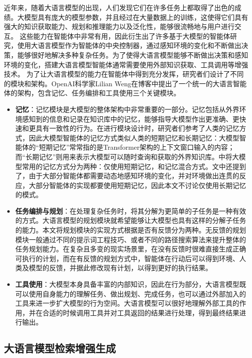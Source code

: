 近年来，随着大语言模型的出现，人们发现它们在许多任务上都取得了出色的成绩。大模型具有庞大的模型参数，并且经过在大量数据上的训练，这使得它们具有强大的知识获取能力、规划和推理能力以及泛化性，能够很流畅地与用户进行交互\cite{Wang2023c, TXJS202409001}。
这些能力在智能体中非常有用，因此衍生出了许多基于大模型的智能体研究\cite{Song2023, Ruan2023, JFYZ202411006, ZGXN202404059}，使用大语言模型作为智能体的中央控制器，通过感知环境的变化和不断做出决策，能够很好地解决多种复杂任务。为了使得大语言模型能够不断做出决策和感知环境的变化，搭建大语言模型智能体通常需要使用外部知识获取、工具调用等增强技术。
为了让大语言模型的能力在智能体中得到充分发挥，研究者们设计了不同的模块和架构。OpenAI科学家Lilian Weng在博客\cite{Weng2023}中提出了一个统一的大语言智能体的架构，包含记忆、任务编排和工具使用三个关键模块。

\begin{itemize}
    \item \textbf{记忆}：记忆模块是大模型的整体架构中非常重要的一部分。记忆包括从外界环境感知到的信息和记录在知识库中的记忆，能够指导大模型作出更准确、更快速和更具有一致性的行为。在进行模块设计时，研究者们参考了人类的记忆方式，因此大模型智能体的记忆方式类似人类的短期记忆和长期记忆：大模型智能体的“短期记忆”常常指的是Transformer\cite{Ge2024}架构的上下文窗口输入的内容；而“长期记忆”则用来表示大模型可以随时查询和获取的外界知识库。\cite{Wang2023c}中将大模型常用的记忆方式分为两种：仅使用短期记忆，和记忆混合方式。文中还提到了，由于大部分智能体都需要动态地感知环境的变化，并对环境做出连贯的反应，大部分智能体的实现都要使用短期记忆，因此本文不讨论仅使用长期记忆的模式。
    \item \textbf{任务编排与规划}：在处理复杂任务时，将其分解为更简单的子任务是一种有效的方式。大语言模型的规划模块就希望能够让大模型也具有这样的分解子任务的能力。本文将规划模块的实现方式根据是否有反馈分为两种。无反馈的规划模块一般通过不同的提示词工程技巧、或者不同的路径搜索算法来提升整体的任务规划能力。在复杂且多变的现实场景里，在没有反馈时很难直接生成正确可执行的计划，而在有反馈的规划方式中，智能体在行动后可以得到环境、人类及模型的反馈，并据此修改现有计划，以得到更好的执行结果。 
    \item \textbf{工具使用}：大模型本身具备丰富的内部知识，因此在行为部分，大语言模型既可以使用自身能力的理解任务、做出规划、完成任务，也可以通过外部加入的工具来进一步扩大模型的行为空间。大语言模型可以很好地理解外部工具的作用，并在合适的时候调用工具并对工具返回的结果进行处理，得到最终结果进行输出。
  \end{itemize}

\subsection{大语言模型检索增强生成}

